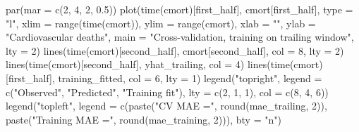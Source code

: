 \documentclass[
]{article}
\newenvironment{Shaded}{\begin{snugshade}}{\end{snugshade}}
\newcommand{\AttributeTok}[1]{\textcolor[rgb]{0.77,0.63,0.00}{#1}}
\newcommand{\DecValTok}[1]{\textcolor[rgb]{0.00,0.00,0.81}{#1}}
\newcommand{\FloatTok}[1]{\textcolor[rgb]{0.00,0.00,0.81}{#1}}
\newcommand{\FunctionTok}[1]{\textcolor[rgb]{0.00,0.00,0.00}{#1}}
\newcommand{\NormalTok}[1]{#1}
\newcommand{\StringTok}[1]{\textcolor[rgb]{0.31,0.60,0.02}{#1}}
\begin{document}
\begin{Shaded}
\begin{Highlighting}[]
\FunctionTok{par}\NormalTok{(}\AttributeTok{mar =} \FunctionTok{c}\NormalTok{(}\DecValTok{2}\NormalTok{, }\DecValTok{4}\NormalTok{, }\DecValTok{2}\NormalTok{, }\FloatTok{0.5}\NormalTok{))}
\FunctionTok{plot}\NormalTok{(}\FunctionTok{time}\NormalTok{(cmort)[first\_half], cmort[first\_half], }\AttributeTok{type =} \StringTok{"l"}\NormalTok{, }
     \AttributeTok{xlim =} \FunctionTok{range}\NormalTok{(}\FunctionTok{time}\NormalTok{(cmort)), }\AttributeTok{ylim =} \FunctionTok{range}\NormalTok{(cmort),}
     \AttributeTok{xlab =} \StringTok{""}\NormalTok{, }\AttributeTok{ylab =} \StringTok{"Cardiovascular deaths"}\NormalTok{, }
     \AttributeTok{main =} \StringTok{"Cross{-}validation, training on trailing window"}\NormalTok{, }\AttributeTok{lty =} \DecValTok{2}\NormalTok{)}
\FunctionTok{lines}\NormalTok{(}\FunctionTok{time}\NormalTok{(cmort)[second\_half], cmort[second\_half], }\AttributeTok{col =} \DecValTok{8}\NormalTok{, }\AttributeTok{lty =} \DecValTok{2}\NormalTok{)}
\FunctionTok{lines}\NormalTok{(}\FunctionTok{time}\NormalTok{(cmort)[second\_half], yhat\_trailing, }\AttributeTok{col =} \DecValTok{4}\NormalTok{)}
\FunctionTok{lines}\NormalTok{(}\FunctionTok{time}\NormalTok{(cmort)[first\_half], training\_fitted, }\AttributeTok{col =} \DecValTok{6}\NormalTok{, }\AttributeTok{lty =} \DecValTok{1}\NormalTok{)}
\FunctionTok{legend}\NormalTok{(}\StringTok{"topright"}\NormalTok{, }\AttributeTok{legend =} \FunctionTok{c}\NormalTok{(}\StringTok{"Observed"}\NormalTok{, }\StringTok{"Predicted"}\NormalTok{, }\StringTok{"Training fit"}\NormalTok{), }
       \AttributeTok{lty =} \FunctionTok{c}\NormalTok{(}\DecValTok{2}\NormalTok{, }\DecValTok{1}\NormalTok{, }\DecValTok{1}\NormalTok{), }\AttributeTok{col =} \FunctionTok{c}\NormalTok{(}\DecValTok{8}\NormalTok{, }\DecValTok{4}\NormalTok{, }\DecValTok{6}\NormalTok{))}
\FunctionTok{legend}\NormalTok{(}\StringTok{"topleft"}\NormalTok{, }\AttributeTok{legend =} \FunctionTok{c}\NormalTok{(}\FunctionTok{paste}\NormalTok{(}\StringTok{"CV MAE ="}\NormalTok{, }\FunctionTok{round}\NormalTok{(mae\_trailing, }\DecValTok{2}\NormalTok{)), }
                             \FunctionTok{paste}\NormalTok{(}\StringTok{"Training MAE ="}\NormalTok{, }\FunctionTok{round}\NormalTok{(mae\_training, }\DecValTok{2}\NormalTok{))),}
       \AttributeTok{bty =} \StringTok{"n"}\NormalTok{)}
\end{Highlighting}
\end{Shaded}
\end{document}
